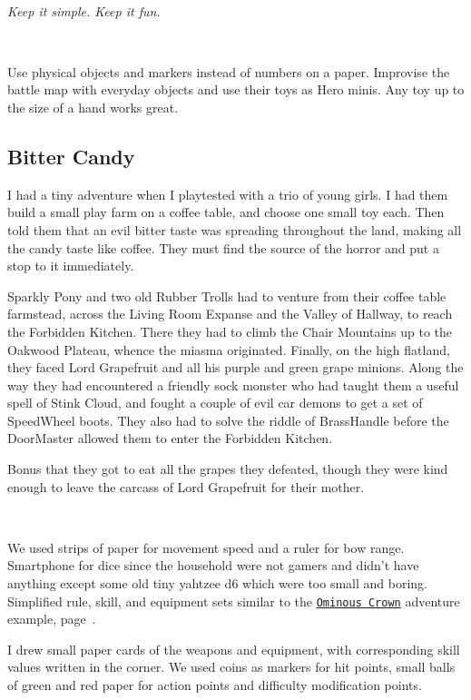 \

\noindent \emph{Keep it simple. Keep it fun.}

\

\noindent
Use physical objects and markers instead of numbers on a paper. Improvise the battle map with everyday objects and use their toys as Hero minis. Any toy up to the size of a hand works great.


\subsection*{Bitter Candy}

I had a tiny adventure when I playtested with a trio of young girls. I had them build a small play farm on a coffee table, and choose one small toy each. Then told them that an evil bitter taste was spreading throughout the land, making all the candy taste like coffee. They must find the source of the horror and put a stop to it immediately.

Sparkly Pony and two old Rubber Trolls had to venture from their coffee table farmstead, across the Living Room Expanse and the Valley of Hallway, to reach the Forbidden Kitchen. There they had to climb the Chair Mountains up to the Oakwood Plateau, whence the miasma originated. Finally, on the high flatland, they faced Lord Grapefruit and all his purple and green grape minions. Along the way they had encountered a friendly sock monster who had taught them a useful spell of Stink Cloud, and fought a couple of evil car demons to get a set of SpeedWheel boots. They also had to solve the riddle of BrassHandle before the DoorMaster allowed them to enter the Forbidden Kitchen.

Bonus that they got to eat all the grapes they defeated, though they were kind enough to leave the carcass of Lord Grapefruit for their mother.

\

We used strips of paper for movement speed and a ruler for bow range. Smartphone for dice since the household were not gamers and didn't have anything except some old tiny yahtzee d6 which were too small and boring.
Simplified rule, skill, and equipment sets similar to the \hyperref[sec:basicenough]{\texttt{Ominous Crown}} adventure example, page~\pageref{sec:basicenough}.

I drew small paper cards of the weapons and equipment, with corresponding skill values written in the corner. We used coins as markers for hit points, small balls of green and red paper for action points and difficulty modification points.








